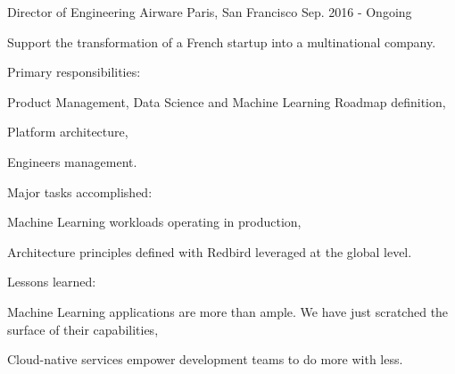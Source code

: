 

\begin{cventries}

  \cventry
    {Director of Engineering} %
    {Airware} %
    {Paris, San Francisco} %
    {Sep. 2016 - Ongoing} %
    {
      \begin{cvitems} %
        \item {Support the transformation of a French startup into a multinational company.}
        \item {Primary responsibilities:}
        \begin{cvsubitems}
          \item {Product Management, Data Science and Machine Learning Roadmap definition,}
          \item {Platform architecture,}
          \item {Engineers management.}
        \end{cvsubitems}
        \item {Major tasks accomplished:}
        \begin{cvsubitems}
          \item {Machine Learning workloads operating in production,}
          \item {Architecture principles defined with Redbird leveraged at the global level.}
        \end{cvsubitems}
        \item {Lessons learned:}
        \begin{cvsubitems}
          \item {Machine Learning applications are more than ample. We have just scratched the surface of their capabilities,}
          \item {Cloud-native services empower development teams to do more with less.}
        \end{cvsubitems}
      \end{cvitems}
    }


\end{cventries}
